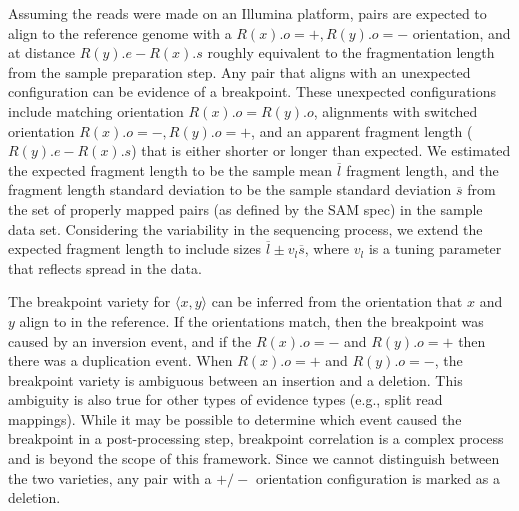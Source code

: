 \documentclass[11pt]{article}
\begin{document}
Assuming the reads were made on an Illumina platform, pairs are expected to
align to the reference genome with a $R(x).o=+, R(y).o=-$ orientation, and at
distance $R(y).e - R(x).s$ roughly equivalent to the fragmentation length from
the sample preparation step.  Any pair that aligns with an unexpected
configuration can be evidence of a breakpoint.  These unexpected configurations
include matching orientation $R(x).o = R(y).o$, alignments with switched
orientation $R(x).o=-, R(y).o=+$, and an apparent fragment length ($R(y).e -
R(x).s$) that is either shorter or longer than expected.  We estimated the
expected fragment length to be the sample mean $\overline{l}$ fragment length,
and the fragment length standard deviation to be the sample standard deviation
$\overline{s}$ from the set of properly mapped pairs (as defined by the SAM
spec) in the sample data set.  Considering the variability in the sequencing
process, we extend the expected fragment length to include sizes 
$\overline{l}\pm v_l \overline{s}$, where $v_l$ is a tuning parameter that
reflects spread in the data.


The breakpoint variety for $\langle x,y \rangle$ can be inferred from the 
orientation that $x$ and $y$ align to in the reference.  If the orientations
match, then the breakpoint was caused by an inversion event, and if the
$R(x).o=-$ and $R(y).o=+$ then there was a duplication event.  When $R(x).o=+$
and $R(y).o=-$, the breakpoint variety is ambiguous between an insertion and a
deletion.  This ambiguity is also true for other types of evidence types (e.g.,
split read mappings).  While it may be possible to determine which event caused
the breakpoint in a post-processing step, breakpoint correlation is a complex
process and is beyond the scope of this framework.  Since we cannot distinguish
between the two varieties, any pair with a $+/-$ orientation configuration is
marked as a deletion.  
\end{document}
